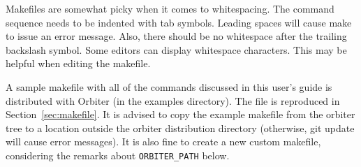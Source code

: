 \bigskip

Makefiles are somewhat picky when it comes to whitespacing.
The command sequence needs to be indented with tab symbols. 
Leading spaces will cause make to issue an error message. 
Also, there should be no whitespace after the trailing backslash symbol.
Some editors can display whitespace characters. This may be helpful when 
editing the makefile.



\bigskip

A sample makefile with all of the commands discussed in this user's guide 
is distributed with Orbiter (in the examples directory). 
The file is reproduced in Section~\ref{sec:makefile}. 
It is advised to copy the example makefile from the orbiter tree to a location outside the orbiter 
distribution directory (otherwise, git update will cause error messages). 
It is also fine to create a new custom makefile, considering the remarks about  \verb'ORBITER_PATH' below.



\bigskip


